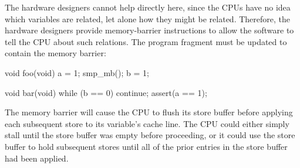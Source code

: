 \EQuickQuizEnd

\EQuickQuizEnd

The hardware designers cannot help directly here, since the CPUs have
no idea which variables are related, let alone how they might be related.
Therefore, the hardware designers provide memory-barrier instructions
to allow the software to tell the CPU about such relations.
The program fragment must be updated to contain the memory barrier:

\begin{VerbatimN}[fontsize=\footnotesize,samepage=true]
void foo(void)
{
	a = 1;
	smp_mb();
	b = 1;
}

void bar(void)
{
	while (b == 0) continue;
	assert(a == 1);
}
\end{VerbatimN}

The memory barrier  will cause the CPU to flush its store
buffer before applying each subsequent store to its variable's cache line.
The CPU could either simply stall until the store buffer was empty
before proceeding, or it could use the store buffer to hold subsequent
stores until all of the prior entries in the store buffer had been
applied.

